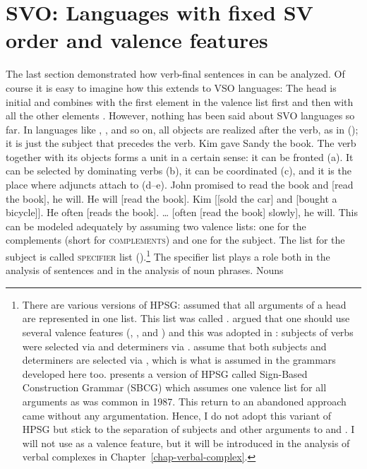 
\section{SVO: Languages with fixed SV order and valence features}
\label{sec-intro-schemata}
\label{sec-intro-spr-comps}

The last section demonstrated how verb-final sentences in  can be analyzed. Of course it is
easy to imagine how this extends to VSO languages: The head is initial and combines with the first
element in the valence list first and then with all the other elements \citep[347--348]{Borsley89b}. However, nothing has been
said about SVO languages so far. In languages like , , and so on, all objects are
realized after the verb, as in (); it is just the subject that precedes the verb.
\ea
Kim gave Sandy the book.
\z
The verb together with its objects forms a unit in a certain sense: it can be fronted (a). It can be
selected by dominating verbs (b), it can be coordinated (c), and it is the place where adjuncts attach to (d--e).
\eal
\ex John promised to read the book and [read the book], he will.
\ex He will [read the book].
\ex Kim [[sold the car] and [bought a bicycle]]. 
\ex He often [reads the book].
\ex \ldots{} [often [read the book] slowly], he will.
\zl
This can be modeled adequately by assuming two valence lists: one for the complements (\comps short for \textsc{complements}) and
one for the subject. The list for the subject is called \textsc{specifier} list
(\spr).\footnote{%
  There are various versions of HPSG: \citet[Chapter~3.2]{ps} assumed that all arguments of a head are
  represented in one list. This list was called \subcatl. \citet{Borsley87a} argued that one should
  use several valence features (\subj, \spr, and \comps) and this was adopted in
  : subjects of verbs were selected via \subj and determiners via
  \spr. \citet*[Chapter~4.3]{SWB2003a} assume that both subjects and determiners are selected via \spr, which is
  what is assumed in the grammars developed here too. \citet[Section~3.3]{Sag2012a} presents a version of HPSG
  called Sign-Based Construction Grammar (SBCG) which assumes one valence list for all arguments as
  was common in 1987. This return to an abandoned approach came without any argumentation. Hence, I do not adopt this
  variant of HPSG but stick to the separation of subjects and other arguments to \spr and \comps. I
  will not use \subj as a valence feature, but it will be introduced in the analysis of verbal
  complexes in Chapter~\ref{chap-verbal-complex}.
} The specifier list plays a role both in the analysis of sentences and in the analysis of noun phrases. Nouns
